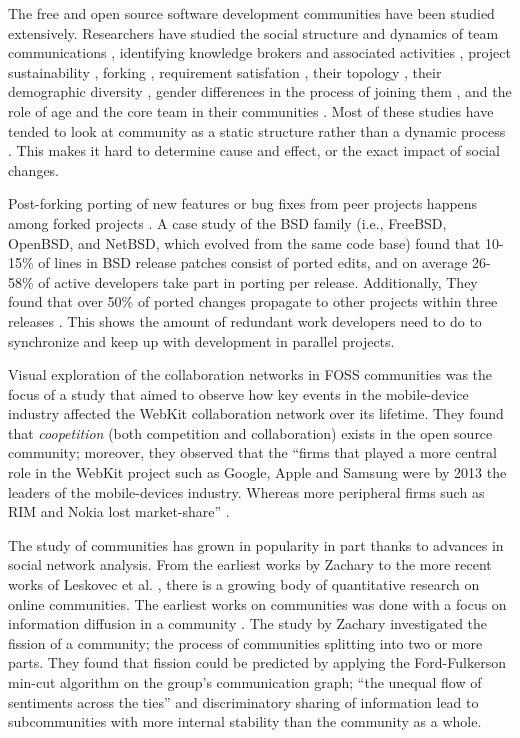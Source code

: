 \documentclass[12pt]{report}
\begin{document}
The free and open source software development communities have been studied extensively. Researchers have studied the social structure and dynamics of team communications \cite{Bird}\cite{Guzzi}\cite{HowisonSocialDynamics}\cite{HowisonFlossMole}\cite{Nakakoji}, identifying knowledge brokers and associated activities \cite{Sowe}, project sustainability \cite{Nakakoji}\cite{NymanForkingSustainability}, forking \cite{NymanCodeForking}, requirement satisfation \cite{Ernst}, their topology \cite{Bird}, their demographic diversity \cite{Kunegis}, gender differences in the process of joining them \cite{Kuechler}, and the role of age and the core team in their communities \cite{AzarbakhtOSS2014}\cite{AzarbakhtINSNA2014}\cite{DavidsonVLHCC2014}\cite{Torres}. Most of these studies have tended to look at community as a static structure rather than a dynamic process \cite{CrowstonFLOSSWhatWeKnow}. This makes it hard to determine cause and effect, or the exact impact of social changes.

Post-forking porting of new features or bug fixes from peer projects happens among forked projects \cite{Baishakhi}. A case study of the BSD family (i.e., FreeBSD, OpenBSD, and NetBSD, which evolved from the same code base) found that 10-15\% of lines in BSD release patches consist of ported edits, and on average 26-58\% of active developers take part in porting per release. Additionally, They found that over 50\% of ported changes propagate to other projects within three releases \cite{Baishakhi}. This shows the amount of redundant work developers need to do to synchronize and keep up with development in parallel projects. 

Visual exploration of the collaboration networks in FOSS communities was the focus of a study that aimed to observe how key events in the mobile-device industry affected the WebKit collaboration network over its lifetime. \cite{JoseWebKit} They found that \textit{coopetition} (both competition and collaboration) exists in the open source community; moreover, they observed that the ``firms that played a more central role in the WebKit project such as Google, Apple and Samsung were by 2013 the leaders of the mobile-devices industry. Whereas more peripheral firms such as RIM and Nokia lost market-share'' \cite{JoseWebKit}. 

The study of communities has grown in popularity in part thanks to advances in social network analysis.  From the earliest works by Zachary \cite{Zachary} to the more recent works of Leskovec et al. \cite{LeskovecGraphsOverTime}\cite{LeskovecStatisticalPropertiesOfCommunityStructure}, there is a growing body of quantitative research on online communities. The earliest works on communities was done with a focus on information diffusion in a community \cite{Zachary}. The study by Zachary investigated the fission of a community; the process of communities splitting into two or more parts. They found that fission could be predicted by applying the Ford-Fulkerson min-cut algorithm \cite{Ford} on the group's communication graph; ``the unequal flow of sentiments across the ties'' and discriminatory sharing of information lead to subcommunities with more internal stability than the community as a whole.\cite{Zachary}
\end{document}
